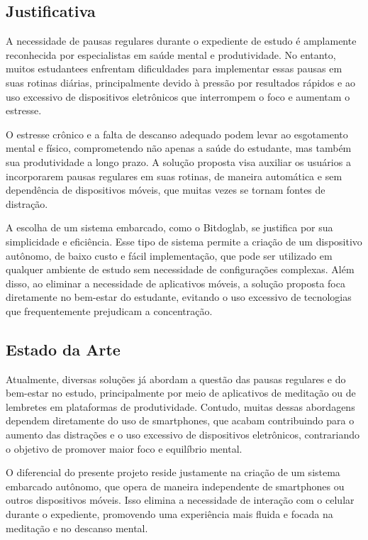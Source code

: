 \documentclass{article}
\begin{document}
\subsection{Justificativa}

A necessidade de pausas regulares durante o expediente de estudo é amplamente reconhecida por especialistas em saúde mental e produtividade. No entanto, muitos estudantees enfrentam dificuldades para implementar essas pausas em suas rotinas diárias, principalmente devido à pressão por resultados rápidos e ao uso excessivo de dispositivos eletrônicos que interrompem o foco e aumentam o estresse.

O estresse crônico e a falta de descanso adequado podem levar ao esgotamento mental e físico, comprometendo não apenas a saúde do estudante, mas também sua produtividade a longo prazo. A solução proposta visa auxiliar os usuários a incorporarem pausas regulares em suas rotinas, de maneira automática e sem dependência de dispositivos móveis, que muitas vezes se tornam fontes de distração.

A escolha de um sistema embarcado, como o Bitdoglab, se justifica por sua simplicidade e eficiência. Esse tipo de sistema permite a criação de um dispositivo autônomo, de baixo custo e fácil implementação, que pode ser utilizado em qualquer ambiente de estudo sem necessidade de configurações complexas. Além disso, ao eliminar a necessidade de aplicativos móveis, a solução proposta foca diretamente no bem-estar do estudante, evitando o uso excessivo de tecnologias que frequentemente prejudicam a concentração.

\subsection{Estado da Arte}

Atualmente, diversas soluções já abordam a questão das pausas regulares e do bem-estar no estudo, principalmente por meio de aplicativos de meditação ou de lembretes em plataformas de produtividade. Contudo, muitas dessas abordagens dependem diretamente do uso de smartphones, que acabam contribuindo para o aumento das distrações e o uso excessivo de dispositivos eletrônicos, contrariando o objetivo de promover maior foco e equilíbrio mental.

O diferencial do presente projeto reside justamente na criação de um sistema embarcado autônomo, que opera de maneira independente de smartphones ou outros dispositivos móveis. Isso elimina a necessidade de interação com o celular durante o expediente, promovendo uma experiência mais fluida e focada na meditação e no descanso mental.
\end{document}
